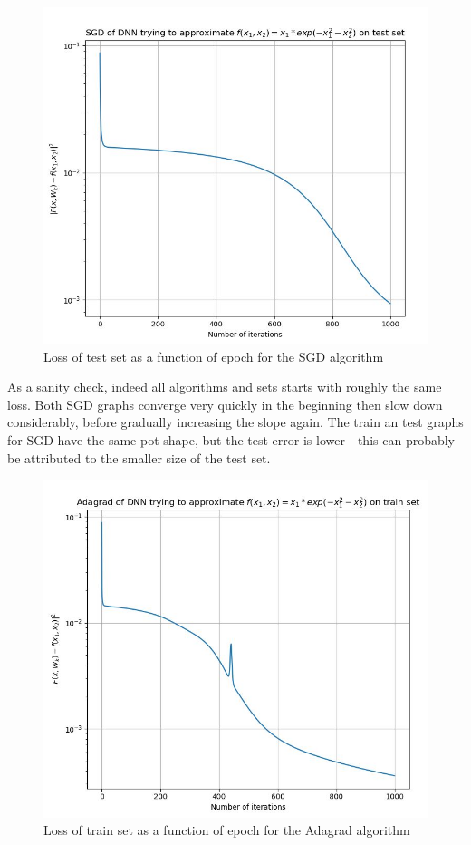 \documentclass[12pt]{scrartcl}
\begin{document}
\begin{figure}[H]
	\hfill\includegraphics{SGD_test_convergence.jpg}\hspace*{\fill}
	\caption{Loss of test set as a function of epoch for the SGD algorithm}
\end{figure}

As a sanity check, indeed all algorithms and sets starts with roughly the same loss. Both SGD graphs converge very quickly in the beginning then slow down considerably, before gradually increasing the slope again. The train an test graphs for SGD have the same pot shape, but the test error is lower - this can probably be attributed to the smaller size of the test set.\\

\begin{figure}[H]
	\hfill\includegraphics{Adagrad_train_convergence.jpg}\hspace*{\fill}
	\caption{Loss of train set as a function of epoch for the Adagrad algorithm}
\end{figure}
\end{document}
